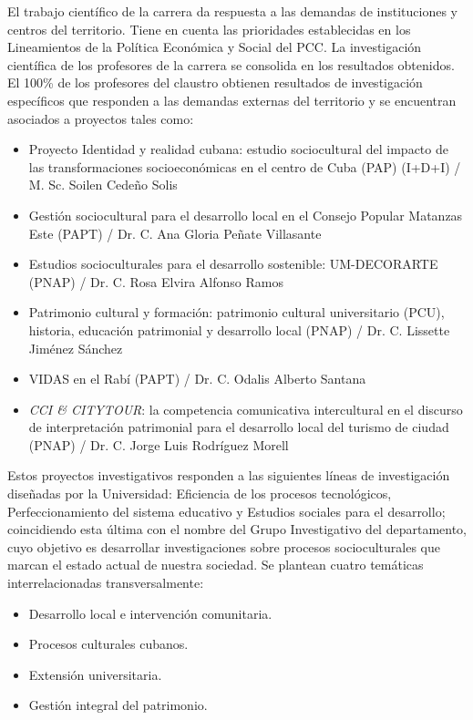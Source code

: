 El   trabajo científico de la carrera da respuesta a las demandas de instituciones y centros del territorio. Tiene en cuenta las prioridades establecidas en los Lineamientos de la Política Económica y Social del PCC. La investigación científica de los profesores de la carrera se consolida en los resultados obtenidos. 
El 100\% de los profesores del claustro obtienen resultados de investigación específicos que responden a las demandas externas del territorio y se encuentran asociados a proyectos tales como:

\begin{itemize}
	\setlength\itemsep{-0.5em}
	\item Proyecto Identidad y realidad cubana: estudio sociocultural del impacto de las transformaciones socioeconómicas en el centro de Cuba (PAP) (I+D+I) / M. Sc. Soilen Cedeño Solis
	\item Gestión sociocultural para el desarrollo local en el Consejo Popular Matanzas Este (PAPT) / Dr. C. Ana Gloria Peñate Villasante
	\item Estudios socioculturales para el desarrollo sostenible: UM-DECORARTE (PNAP) / Dr. C. Rosa Elvira Alfonso Ramos
	\item Patrimonio cultural y formación: patrimonio cultural universitario (PCU), historia, educación patrimonial y desarrollo local (PNAP) / Dr. C. Lissette Jiménez Sánchez
	\item VIDAS en el Rabí (PAPT) / Dr. C. Odalis Alberto Santana
	\item \emph{CCI \& CITYTOUR}:  la competencia comunicativa intercultural en el discurso de interpretación patrimonial para el desarrollo local del turismo de ciudad (PNAP) / Dr. C. Jorge Luis Rodríguez Morell
	
\end{itemize}

Estos proyectos investigativos responden a las siguientes líneas de investigación diseñadas por la Universidad: Eficiencia de los procesos tecnológicos, Perfeccionamiento del sistema educativo y Estudios sociales para el desarrollo; coincidiendo esta última con el nombre del Grupo Investigativo del departamento, cuyo objetivo es desarrollar investigaciones sobre procesos socioculturales que marcan el estado actual de nuestra sociedad. Se plantean cuatro temáticas interrelacionadas transversalmente: 

\begin{itemize}
	\setlength\itemsep{-0.5em}
	\item Desarrollo local e intervención comunitaria.
	\item Procesos culturales cubanos.
	\item Extensión universitaria.
	\item Gestión integral del patrimonio.
\end{itemize}

